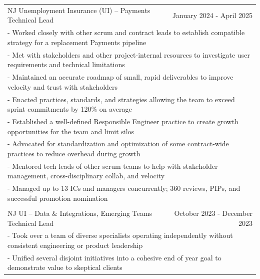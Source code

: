 \documentclass[letterpaper]{article}
\begin{document}
\begin{center}
\begin{tabular}{p{}p{}r}
			  \\
			  \multicolumn{2}{p{0.5\textwidth}}{\quad NJ Unemployment Insurance (UI) -- Payments Technical Lead}
			  &
			  {January 2024 - April 2025 \quad\quad\quad\quad}
		  \\
			  \multicolumn{3}{p{\textwidth}}{\quad\quad - Worked closely with other scrum and contract leads to establish compatible strategy for a replacement Payments pipeline} \\
			  \multicolumn{3}{p{\textwidth}}{\quad\quad - Met with stakeholders and other project-internal resources to investigate user requirements and technical limitations} \\
			  \multicolumn{3}{p{\textwidth}}{\quad\quad - Maintained an accurate roadmap of small, rapid deliverables to improve velocity and trust with stakeholders} \\
			  \multicolumn{3}{p{\textwidth}}{\quad\quad - Enacted practices, standards, and strategies allowing the team to exceed sprint commitments by 120\% on average  } \\
			  \multicolumn{3}{p{\textwidth}}{\quad\quad - Established a well-defined Responsible Engineer practice to create growth opportunities for the team and limit silos} \\
			  \multicolumn{3}{p{\textwidth}}{\quad\quad - Advocated for standardization and optimization of some contract-wide practices to reduce overhead during growth} \\
			  \multicolumn{3}{p{\textwidth}}{\quad\quad - Mentored tech leads of other scrum teams to help with stakeholder management, cross-disciplinary collab, and velocity } \\
			  \multicolumn{3}{p{\textwidth}}{\quad\quad - Managed up to 13 ICs and managers concurrently; 360 reviews, PIPs, and successful promotion nomination }
		  \\
		  \\
			  \multicolumn{2}{p{0.5\textwidth}}{\quad NJ UI -- Data \& Integrations, Emerging Teams Technical Lead}
			  &
			  {October 2023 - December 2023 \quad\quad\quad\quad}
		  \\
			  \multicolumn{3}{p{\textwidth}}{\quad\quad - Took over a team of diverse specialists operating independently without consistent engineering or product leadership} \\
			  \multicolumn{3}{p{\textwidth}}{\quad\quad - Unified several disjoint initiatives into a cohesive end of year goal to demonstrate value to skeptical clients} \\

\end{tabular}
\end{center}
\end{document}
